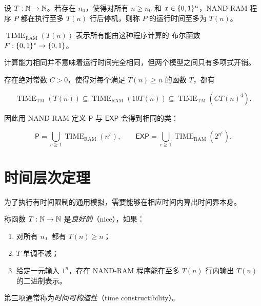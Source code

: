 \begin{definition}
  \label{def:ram-running-time}
  设 $T:\mathbb{N}\to\mathbb{N}$。若存在 $n_0$，使得对所有 $n\geq n_0$ 和
  $x\in\{0,1\}^n$，NAND-RAM 程序 $P$ 都在执行至多 $T(n)$ 行后停机，则称
  $P$ 的运行时间至多为 $T(n)$。

  $\operatorname{TIME}_{\mathrm{RAM}}(T(n))$ 表示所有能由这种程序计算的
  布尔函数 $F:\{0,1\}^{*}\to\{0,1\}$。
\end{definition}

计算能力相同并不意味着运行时间完全相同，但两个模型之间只有多项式开销。

\begin{theorem}
  \label{thm:tm-ram-time-simulation}
  存在绝对常数 $C>0$，使得对每个满足 $T(n)\geq n$ 的函数 $T$，都有

  \[
    \operatorname{TIME}_{\mathrm{TM}}(T(n))
    \subseteq
    \operatorname{TIME}_{\mathrm{RAM}}(10T(n))
    \subseteq
    \operatorname{TIME}_{\mathrm{TM}}(C T(n)^4).
  \]
\end{theorem}

因此用 NAND-RAM 定义 $\mathsf P$ 与 $\mathsf{EXP}$ 会得到相同的类：

\[
  \mathsf P
    =\bigcup_{c\geq 1}\operatorname{TIME}_{\mathrm{RAM}}(n^c),
  \qquad
  \mathsf{EXP}
    =\bigcup_{c\geq 1}\operatorname{TIME}_{\mathrm{RAM}}(2^{n^c}).
\]

\section{时间层次定理}

为了执行有时间限制的通用模拟，需要能够在相应时间内算出时间界本身。

\begin{definition}[良好时间界]
  \label{def:nice-time-bound}
  称函数 $T:\mathbb{N}\to\mathbb{N}$ 是\emph{良好的}（nice），如果：

  \begin{enumerate}[label=\arabic*.]
    \item 对所有 $n$，都有 $T(n)\geq n$；
    \item $T$ 单调不减；
    \item 给定一元输入 $1^n$，存在 NAND-RAM 程序能在至多 $T(n)$ 行内输出
      $T(n)$ 的二进制表示。
  \end{enumerate}

  第三项通常称为\emph{时间可构造性}（time constructibility）。
\end{definition}

